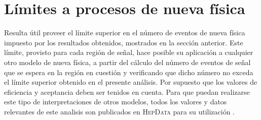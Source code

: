 











\clearpage


\section{Límites a procesos de nueva física} \label{sec:model_independent}

Resulta útil proveer el límite superior en el número de eventos de
nueva física impuesto por los resultados obtenidos, mostrados en la sección
anterior. Este límite, provisto para
cada región de señal, hace posible su aplicación a cualquier otro modelo de
nueva física, a partir del cálculo del número de eventos de señal que se espera
en la región en cuestión y verificando que dicho número no exceda el límite
superior obtenido en el presente análisis. Por supuesto que los valores de eficiencia y aceptancia deben ser
tenidos en cuenta.
Para que puedan realizarse este tipo de interpretaciones de otros modelos, todos
los valores y datos relevantes de este analisis son publicados en \textsc{HepData}
para su utilización \cite{hepdata}.

